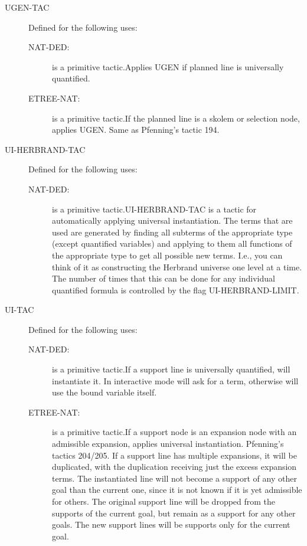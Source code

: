 \begin{description}
\begin{description}
\end{description}

\item[UGEN-TAC]  Defined for the following uses:
\begin{description}
\item[NAT-DED:]  is a primitive tactic.Applies UGEN if planned line is universally quantified.

\item[ETREE-NAT:]  is a primitive tactic.If the planned line is a skolem or selection node, applies UGEN.
Same as Pfenning's tactic 194.

\end{description}

\item[UI-HERBRAND-TAC]  Defined for the following uses:
\begin{description}
\item[NAT-DED:]  is a primitive tactic.UI-HERBRAND-TAC is a tactic for automatically applying universal
instantiation.  The terms that are used are generated by finding all
subterms of the appropriate type (except quantified variables) and applying
to them all functions of the appropriate type to get all possible new terms.
I.e., you can think of it as constructing the Herbrand universe one level
at a time.  The number of times that this can be done for any individual 
quantified formula is controlled by the flag UI-HERBRAND-LIMIT.

\end{description}

\item[UI-TAC]  Defined for the following uses:
\begin{description}
\item[NAT-DED:]  is a primitive tactic.If a support line is universally quantified, will instantiate it.  In
interactive mode will ask for a term, otherwise will use the bound
variable itself.

\item[ETREE-NAT:]  is a primitive tactic.If a support node is an expansion node with an admissible expansion,
applies universal instantiation.  Pfenning's tactics 204/205.  If a support
line has multiple expansions, it will be duplicated, with the duplication
receiving just the excess expansion terms.  The instantiated line will
not become a support of any other goal than the current one, since it
is not known if it is yet admissible for others.  The original support
line will be dropped from the supports of the current goal, but
remain as a support for any other goals.  The new support lines
will be supports only for the current goal.


\end{description}
\end{description}
